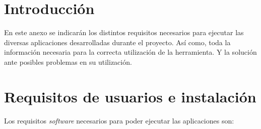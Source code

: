 \label{manuser}
\section{Introducción}

En este anexo se indicarán los distintos requisitos necesarios para ejecutar las diversas aplicaciones desarrolladas durante el proyecto. Así como, toda la información necesaria para la correcta utilización de la herramienta. Y la solución ante posibles problemas en su utilización.

\section{Requisitos de usuarios e instalación}

Los requisitos \textit{software} necesarios para poder ejecutar las aplicaciones son:


